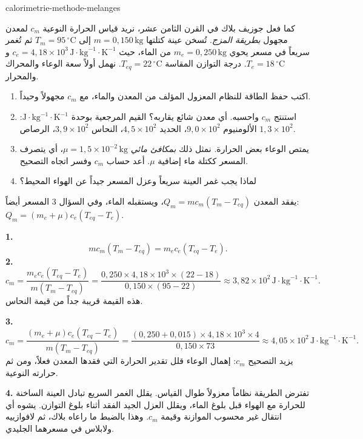 \begin{exo}{calorimetrie-methode-melanges}

كما فعل جوزيف بلاك في القرن الثامن عشر، نريد قياس الحرارة النوعية $c_m$ لمعدن مجهول \emph{بطريقة المزج}. تُسخن عينة كتلتها $m=0{,}150\,\text{kg}$ إلى $T_m=95\,^\circ\text{C}$ ثم تُغمر سريعاً في مسعر يحوي $m_e=0{,}250\,\text{kg}$ من الماء، حيث $c_e=4{,}18\times10^3\,\text{J}\!\cdot\!\text{kg}^{-1}\!\cdot\!\text{K}^{-1}$ و$T_e=18\,^\circ\text{C}$. درجة التوازن المقاسة $T_{eq}=22\,^\circ\text{C}$. نهمل أولاً سعة الوعاء والمحراك والمحرار.
\begin{enumerate}
  \item اكتب حفظ الطاقة للنظام المعزول المؤلف من المعدن والماء، مع $c_m$ مجهولاً وحيداً.
  \item استنتج $c_m$ واحسبه. أي معدن شائع يقاربه؟ القيم المرجعية بوحدة $\text{J}\!\cdot\!\text{kg}^{-1}\!\cdot\!\text{K}^{-1}$: الألومنيوم $9{,}0\times10^2$، الحديد $4{,}5\times10^2$، النحاس $3{,}9\times10^2$، الرصاص $1{,}3\times10^2$.
  \item يمتص الوعاء بعض الحرارة. نمثل ذلك \emph{بمكافئ مائي} $\mu=1{,}5\times10^{-2}\,\text{kg}$، أي يتصرف المسعر ككتلة ماء إضافية $\mu$. أعد حساب $c_m$ وفسر اتجاه التصحيح.
  \item لماذا يجب غمر العينة سريعاً وعزل المسعر جيداً عن الهواء المحيط؟
\end{enumerate}
\begin{indication}
يفقد المعدن $Q_m=mc_m(T_m-T_{eq})$، ويستقبله الماء، وفي السؤال 3 المسعر أيضاً: $Q_m=(m_e+\mu)c_e(T_{eq}-T_e)$.
\end{indication}
\begin{solution}
\textbf{1.}
\[
mc_m(T_m-T_{eq})=m_ec_e(T_{eq}-T_e).
\]
\textbf{2.}
\[
c_m=\frac{m_ec_e(T_{eq}-T_e)}{m(T_m-T_{eq})}
=\frac{0{,}250\times4{,}18\times10^3\times(22-18)}{0{,}150\times(95-22)}
\approx3{,}82\times10^2\,\text{J}\!\cdot\!\text{kg}^{-1}\!\cdot\!\text{K}^{-1}.
\]
هذه القيمة قريبة جداً من قيمة النحاس.

\textbf{3.}
\[
c_m=\frac{(m_e+\mu)c_e(T_{eq}-T_e)}{m(T_m-T_{eq})}
=\frac{(0{,}250+0{,}015)\times4{,}18\times10^3\times4}{0{,}150\times73}
\approx4{,}05\times10^2\,\text{J}\!\cdot\!\text{kg}^{-1}\!\cdot\!\text{K}^{-1}.
\]
يزيد التصحيح $c_m$: إهمال الوعاء قلل تقدير الحرارة التي فقدها المعدن فعلاً، ومن ثم حرارته النوعية.

\textbf{4.} تفترض الطريقة نظاماً معزولاً طوال القياس. يقلل الغمر السريع تبادل العينة الساخنة للحرارة مع الهواء قبل بلوغ الماء، ويقلل العزل الجيد الفقد أثناء بلوغ التوازن. يشوه أي انتقال غير محسوب الموازنة وقيمة $c_m$. وهذا بالضبط ما راعاه بلاك، ثم لافوازييه ولابلاس في مسعرهما الجليدي.
\end{solution}
\end{exo}

